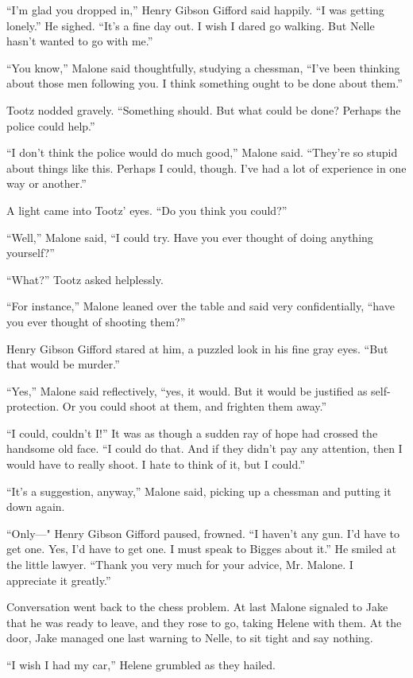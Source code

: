 \documentclass{novel}
\begin{document}
“I’m glad you dropped in,” Henry Gibson Gifford said happily. “I was getting lonely.” He sighed. “It’s a fine day out. I wish I dared go walking. But Nelle hasn’t wanted to go with me.”

“You know,” Malone said thoughtfully, studying a chessman, “I’ve been thinking about those men following you. I think something ought to be done about them.”

Tootz nodded gravely. “Something should. But what could be done? Perhaps the police could help.”

“I don’t think the police would do much good,” Malone said. “They’re so stupid about things like this. Perhaps I could, though. I’ve had a lot of experience in one way or another.”

A light came into Tootz’ eyes. “Do you think you could?”

“Well,” Malone said, “I could try. Have you ever thought of doing anything yourself?”

“What?” Tootz asked helplessly.

“For instance,” Malone leaned over the table and said very confidentially, “have you ever thought of shooting them?”

Henry Gibson Gifford stared at him, a puzzled look in his fine gray eyes. “But that would be murder.”

“Yes,” Malone said reflectively, “yes, it would. But it would be justified as self-protection. Or you could shoot at them, and frighten them away.”

“I could, couldn’t I!” It was as though a sudden ray of hope had crossed the handsome old face. “I could do that. And if they didn’t pay any attention, then I would have to really shoot. I hate to think of it, but I could.”

“It’s a suggestion, anyway,” Malone said, picking up a chessman and putting it down again.

“Only—" Henry Gibson Gifford paused, frowned. “I haven’t any gun. I’d have to get one. Yes, I’d have to get one. I must speak to Bigges about it.” He smiled at the little lawyer. “Thank you very much for your advice, Mr. Malone. I appreciate it greatly.”

Conversation went back to the chess problem. At last Malone signaled to Jake that he was ready to leave, and they rose to go, taking Helene with them. At the door, Jake managed one last warning to Nelle, to sit tight and say nothing.

“I wish I had my car,” Helene grumbled as they hailed.
\end{document}
